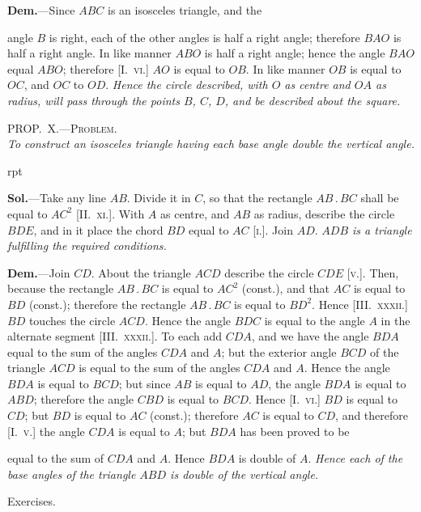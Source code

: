 \documentclass[oneside]{book}
\newcounter{wrapwidth}
\newcommand\myprop[2]{
\bigskip\Needspace*{4\baselineskip}\begin{center}\textsc{#1}\\\medskip\emph{#2}\par\end{center}
}
\newcommand\exhead[1]{
\Needspace*{5\baselineskip}\begin{center}
\textsf{#1}
\end{center}
}
\newcommand\imgflow[3]{
\setcounter{wrapwidth}{#1}

\begin{wrapfigure}[#2]{r}{\value{wrapwidth}pt}
\begin{center}
\vspace{-0.3in}

\end{center}
\end{wrapfigure}
}
\begin{document}
\textbf{Dem.}---Since $ABC$ is an isosceles triangle, and the

angle $B$ is right, each of the other angles is half a right
angle; therefore $BAO$ is half a right angle. In like
manner $ABO$ is half a right angle; hence the angle
$BAO$ equal $ABO$; therefore [\textsc{I.~vi.}] $AO$ is equal to $OB$.
In like manner $OB$ is equal to $OC$, and $OC$ to $OD$.
\emph{Hence the circle described, with $O$ as centre and $OA$ as
radius, will pass through the points $B$, $C$, $D$, and be
described about the square.}

\myprop{PROP\@.~X.---Problem.}{To construct an isosceles triangle having each base angle
double the vertical angle.}


\imgflow{130}{11}{f162}

\textbf{Sol.}---Take any line $AB$. Divide it in $C$, so that the
rectangle $AB\,.\,BC$ shall be equal
to $AC^2$ [\textsc{II\@.~xi.}]. With $A$ as centre,
and $AB$ as radius, describe
the circle $BDE$, and in it place
the chord $BD$ equal to $AC$ [\textsc{i.}].
Join $AD$. \emph{$ADB$ is a triangle fulfilling
the required conditions.}

\textbf{Dem.}---Join $CD$. About the
triangle $ACD$ describe the circle
$CDE$ [\textsc{v.}]. Then, because the
rectangle $AB\,.\,BC$ is equal to
$AC^2$ (const.), and that $AC$ is equal to $BD$ (const.);
therefore the rectangle $AB\,.\,BC$ is equal to $BD^2$. Hence
[\textsc{III\@.~xxxii.}] $BD$ touches the circle $ACD$. Hence the
angle $BDC$ is equal to the angle $A$ in the alternate segment
[\textsc{III\@.~xxxii.}]. To each add $CDA$, and we have the
angle $BDA$ equal to the sum of the angles $CDA$ and $A$;
but the exterior angle $BCD$ of the triangle $ACD$ is
equal to the sum of the angles $CDA$ and $A$. Hence the
angle $BDA$ is equal to $BCD$; but since $AB$ is equal to
$AD$, the angle $BDA$ is equal to $ABD$; therefore the
angle $CBD$ is equal to $BCD$. Hence [\textsc{I.~vi.}] $BD$ is
equal to $CD$; but $BD$ is equal to $AC$ (const.); therefore
$AC$ is equal to $CD$, and therefore [\textsc{I.~v.}] the angle
$CDA$ is equal to $A$; but $BDA$ has been proved to be

equal to the sum of $CDA$ and $A$. Hence $BDA$ is double
of $A$. \textit{Hence each of the base angles of the triangle $ABD$
is double of the vertical angle.}

\exhead{Exercises.}
\end{document}

